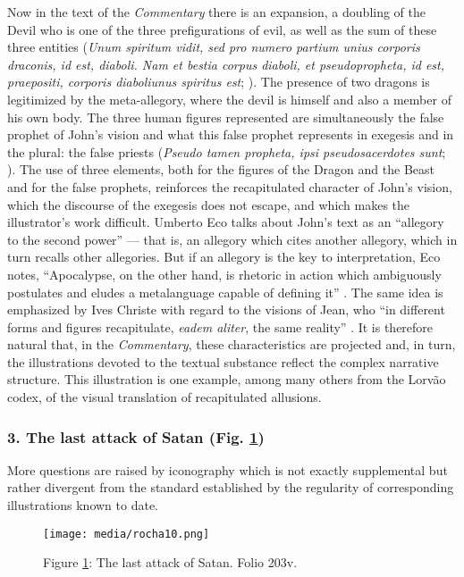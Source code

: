 \documentclass{article}
\begin{document}
 
Now in the text of the
\emph{Commentary} there is an expansion, a doubling of the Devil who is
one of the three prefigurations of evil, as well as the sum of these
three entities (\emph{Unum spiritum vidit, sed pro numero partium unius
corporis draconis, id est, diaboli. Nam et bestia corpus diaboli, et
pseudopropheta, id est, praepositi, corporis diaboliunus spiritus est}; \citealt[552]{gonzalez_echegaray_obras_1995}). The presence of two dragons is
legitimized by the meta-allegory, where the devil is himself and also a
member of his own body. The three human figures represented are
simultaneously the false prophet of John's vision and what this false
prophet represents in exegesis and in the plural: the false priests
(\emph{Pseudo tamen propheta, ipsi pseudosacerdotes sunt};
\citealt[552]{gonzalez_echegaray_obras_1995}). The use of three elements, both for the figures of the
Dragon and the Beast and for the false prophets, reinforces the
recapitulated character of John's vision, which the discourse of the
exegesis does not escape, and which makes the illustrator's work
difficult. Umberto Eco talks about John's text as an ``allegory to the
second power'' –– that is, an allegory which cites another allegory,
which in turn recalls other allegories. But if an allegory is the key to
interpretation, Eco notes, ``Apocalypse, on the other hand, is rhetoric
in action which ambiguously postulates and eludes a metalanguage capable
of defining it'' \citep[26--27]{eco_beato_1982}. The same idea is emphasized by Ives
Christe with regard to the visions of Jean, who ``in different forms and
figures recapitulate, \emph{eadem aliter}, the same reality'' \citep[1:56]{noauthor_actas_1978}. It is therefore natural that, in the \emph{Commentary},
these characteristics are projected and, in turn, the illustrations
devoted to the textual substance reflect the complex narrative
structure. This illustration is one example, among many others from the
Lorvão codex, of the visual translation of recapitulated allusions.

\subsubsection{3. The last attack of Satan (Fig. \ref{fig:rocha:attack})} More questions are
raised by iconography which is not exactly supplemental but rather
divergent from the standard established by the regularity of
corresponding illustrations known to date. 

\begin{figure}[H]
    \centering
    \texttt{[image: media/rocha10.png]}
    \caption{Figure \ref{fig:rocha:attack}: The last attack of Satan. Folio 203v.}
    \label{fig:rocha:attack}
\end{figure}
\end{document}
